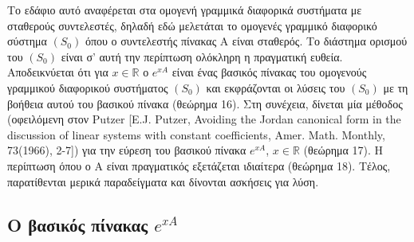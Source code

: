 \documentclass[11pt,a4paper,twoside]{book}
\begin{document}
Το εδάφιο αυτό αναφέρεται στα ομογενή γραμμικά διαφορικά συστήματα με σταθερούς συντελεστές, δηλαδή εδώ μελετάται το ομογενές γραμμικό διαφορικό σύστημα $(S_0)$ όπου ο συντελεστής πίνακας Α είναι σταθερός. Το διάστημα ορισμού του $(S_0)$ είναι σ' αυτή την περίπτωση ολόκληρη η πραγματική ευθεία. Αποδεικνύεται ότι για $x \in \mathbb{R}$ ο $e^{xA}$ είναι ένας βασικός πίνακας του ομογενούς γραμμικού διαφορικού συστήματος $(S_0)$ και εκφράζονται οι λύσεις του $(S_0)$ με τη βοήθεια αυτού του βασικού πίνακα (θεώρημα 16). Στη συνέχεια, δίνεται μία μέθοδος (οφειλόμενη στον Putzer [E.J. Putzer, Avoiding the Jordan canonical form in the discussion of linear systems with constant coefficients, Amer. Math. Monthly, 73(1966), 2-7]) για την εύρεση του βασικού πίνακα $e^{xA}$, $x \in \mathbb{R}$ (θεώρημα 17). Η περίπτωση όπου ο Α είναι πραγματικός εξετάζεται ιδιαίτερα (θεώρημα 18). Τέλος, παρατίθενται μερικά παραδείγματα και δίνονται ασκήσεις για λύση.

\subsection{Ο βασικός πίνακας $e^{xA}$}
\end{document}
